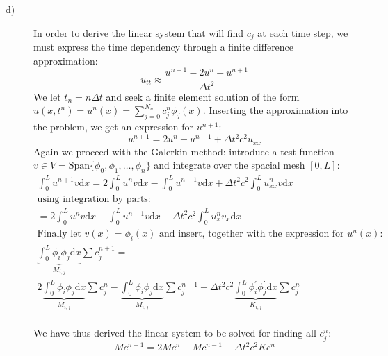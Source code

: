 \documentclass[a4paper,10pt]{article}
\begin{document}
\begin{description}
\vspace{1cm}
\item[d)]
In order to derive the linear system that will find $c_j$ at each time step, we must express the time dependency through a finite 
difference approximation:
\[ u_{tt} \approx \frac{u^{n-1} - 2 u^n + u^{n+1}}{\Delta t^2} \]
We let $t_n = n \Delta t$ and seek a finite element solution of the form \newline $u(x, t^n) = u^n (x) = \sum_{j=0}^{N_n} c_j^n \phi_j (x)$. 
\newline Inserting the approximation into the problem, we  get an expression for $u^{n+1}$:
\[ u^{n+1} = 2 u^n - u^{n-1} + \Delta t^2 c^2 u_{xx} \]
Again we proceed with the Galerkin method: introduce a test function $v \in V = \mathrm{Span} \{ \phi_0, \phi_1, {\dots}, \phi_n \}$
and integrate over the spacial mesh $[0, L]$:
\begin{multline*}
 \int_0^L u^{n+1} v \mathrm{d} x = 2 \int_0^L u^n v \mathrm{d} x - 
 \int_0^L u^{n-1} v \mathrm{d} x + \Delta t^2 c^2 \int_0^L u^n_{xx} v \mathrm{d} x \\
\text{using integration by parts:} \\
= 2 \int_0^L u^n v \mathrm{d} x - \int_0^L u^{n-1} v \mathrm{d} x - \Delta t^2 c^2 \int_0^L u^n_x v_x \mathrm{d} x \\
\text{Finally let $v (x) = \phi_i (x) $ and insert, together with the expression for $u^n (x)$: } \\
\underbrace{ \int_0^L \phi_i \phi_j \mathrm{d} x}_{M_{i,j}} \sum c_j^{n+1} = \\ 2 \underbrace{ \int_0^L \phi_i \phi_j \mathrm{d} x }_{M_{i,j}} 
\sum c_j^n - \underbrace{ \int_0^L \phi_i \phi_j \mathrm{d} x}_{M_{i,j}} \sum c_j^{n-1} - 
\Delta t^2 c^2 \underbrace{ \int_0^L \phi_i^{'} \phi_j^{'} \mathrm{d} x }_{K_{i,j}} \sum c_j^n \\
\end{multline*}

We have thus derived the linear system to be solved for finding all $c_j^n$:
\[ M c^{n+1} = 2M c^n - M c^{n-1} - \Delta t^2 c^2 K c^n\]


\end{description}
\end{document}
